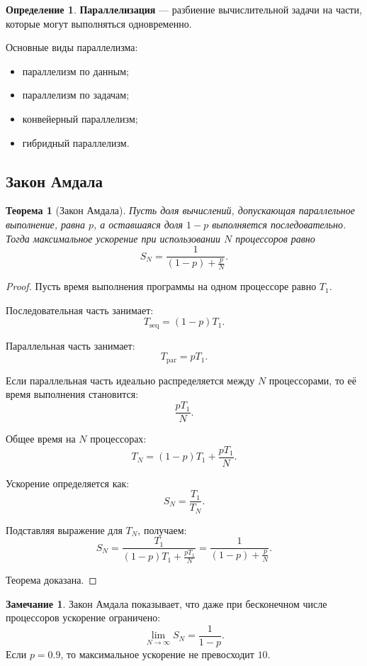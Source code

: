 \documentclass[12pt,a4paper]{article}
\theoremstyle{definition}
\newtheorem{definition}{Определение}
\newtheorem{remark}{Замечание}
\theoremstyle{plain}
\newtheorem{theorem}{Теорема}
\begin{document}
\begin{definition}
\textbf{Параллелизация} --- разбиение вычислительной задачи на части, которые могут выполняться одновременно.
\end{definition}

Основные виды параллелизма:
\begin{itemize}
    \item параллелизм по данным;
    \item параллелизм по задачам;
    \item конвейерный параллелизм;
    \item гибридный параллелизм.
\end{itemize}

\subsection{Закон Амдала}

\begin{theorem}[Закон Амдала]
Пусть доля вычислений, допускающая параллельное выполнение, равна $p$, а оставшаяся доля $1-p$ выполняется последовательно. Тогда максимальное ускорение при использовании $N$ процессоров равно
\[
S_N
=
\frac{1}{(1-p)+\frac{p}{N}}.
\]
\end{theorem}

\begin{proof}
Пусть время выполнения программы на одном процессоре равно $T_1$.

Последовательная часть занимает:
\[
T_{\text{seq}}=(1-p)T_1.
\]

Параллельная часть занимает:
\[
T_{\text{par}}=pT_1.
\]

Если параллельная часть идеально распределяется между $N$ процессорами, то её время выполнения становится:
\[
\frac{pT_1}{N}.
\]

Общее время на $N$ процессорах:
\[
T_N=(1-p)T_1+\frac{pT_1}{N}.
\]

Ускорение определяется как:
\[
S_N=\frac{T_1}{T_N}.
\]

Подставляя выражение для $T_N$, получаем:
\[
S_N
=
\frac{T_1}{(1-p)T_1+\frac{pT_1}{N}}
=
\frac{1}{(1-p)+\frac{p}{N}}.
\]

Теорема доказана.
\end{proof}

\begin{remark}
Закон Амдала показывает, что даже при бесконечном числе процессоров ускорение ограничено:
\[
\lim_{N\to\infty} S_N = \frac{1}{1-p}.
\]
Если $p=0.9$, то максимальное ускорение не превосходит $10$.
\end{remark}
\end{document}
